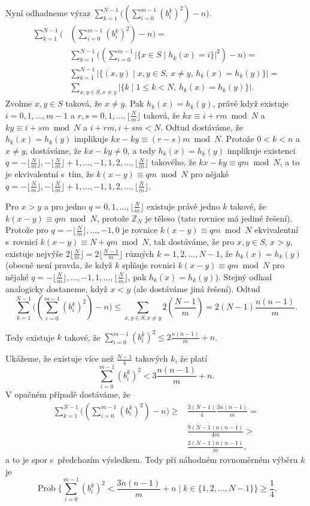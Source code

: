 \documentclass[a4paper,12pt]{article}
\DeclareMathOperator*{\Prob}{Prob}
\begin{document}
Nyní odhadneme výraz $\sum_{k=1}^{N-1}\big((\sum_{
i=0}^{m-1}(b_i^k)^2)-n\big)$.
\begin{align*}\sum_{k=1}^{N-1}\big(&(\sum_{i=0}^{m-1}(b_i^k)^2)-n\big)=\\
&\sum_{k=1}^{N-1}\big((\sum_{i=0}^{m-1}|\{x\in S\mid h_k(x)=i\}|^
2)-n\big)=\\
&\sum_{k=1}^{N-1}|\{(x,y)\mid x,y\in S,\,x\ne y,\,h_k(x)=h_k(y)\}
|=\\
&\sum_{x,y\in S,x\ne y}|\{k\mid 1\le k<N,\,h_k(x)=h_k(y)\}|.\end{align*}
Zvolme $x,y\in S$ taková, že $x\ne y$. Pak $h_k(x)=h_k(y)$, 
právě když existuje $i=0,1,\dots,m-1$ a $r,s=0,1,\dots,\lfloor\frac 
Nm\rfloor$ 
taková, že $kx\equiv i+rm\bmod N$ a $ky\equiv i+sm\bmod N$ a $
i+rm,i+sm<N$. Odtud dostáváme, že $h_k(x)=h_k(y)$ implikuje $
kx-ky\equiv (r-s)m\bmod N$.
Protože $0<k<n$ a $x\ne y$, dostáváme, že $kx-ky\ne 0$, a tedy 
$h_k(x)=h_k(y)$ implikuje existenci 
$q=-\lfloor\frac Nm\rfloor ,-\lfloor\frac Nm\rfloor +1,\dots,-1,1
,2,\dots,\lfloor\frac Nm\rfloor$ takového, že 
$kx-ky\equiv qm\bmod N$,
a to je 
ekvivalentní s~tím, že $k(x-y)\equiv qm\bmod N$ pro nějaké 
$q=-\lfloor\frac Nm\rfloor ,-\lfloor\frac Nm\rfloor +1,\dots,-1,1
,2,\dots,\lfloor\frac Nm\rfloor$.

Pro $x>y$ a pro jedno $q=0,1,\dots,\lfloor\frac Nm\rfloor$ e\-xis\-tuje 
právě jedno $k$ takové, že $k(x-y)\equiv qm\bmod N$, protože 
$\mathbb Z_N$ je těleso (tato rovnice má jediné řešení). 
Protože pro $q=-\lfloor\frac Nm\rfloor ,\dots,-1,0$ je rovnice $
k(x-y)\equiv qm\bmod N$ 
ekvivalentní s~rovnicí $k(x-y)\equiv N+qm\bmod N$, tak 
dostáváme, že pro $x,y\in S$, $x>y$, existuje nejvýše 
$2\lfloor\frac Nm\rfloor =2\lfloor\frac {N-1}m\rfloor$ různých $
k=1,2,\dots,N-1$, že $h_k(x)=h_k(y)$ (obecně není pravda, že když 
$k$ splňuje rovnici $k(x-y)\equiv qm\bmod N$ pro nějaké 
$q=-\lfloor\frac Nm\rfloor ,\dots,-1,1,\dots,\lfloor\frac Nm\rfloor$, 
pak $h_k(x)=h_k(y)$). Stejný odhad analogicky dostaneme, když $
x<y$ 
(ale dostáváme jiná řešení). Odtud 
$$\sum_{k=1}^{N-1}\big((\sum_{i=0}^{m-1}(b_i^k)^2)-n\big)\le\sum_{
x,y\in S,x\ne y}2(\frac {N-1}m)=2(N-1)\frac {n(n-1)}m.$$

Tedy existuje $k$ takové, že $\sum_{i=0}^{m-1}(b_i^
k)^2\le 2\frac {n(n-1)}m+n$. 

Ukážeme, že existuje více než $\frac {N-
1}4$ takových 
$k$, že platí
$$\sum_{i=0}^{m-1}(b_i^k)^2<3\frac {n(n-1)}m+n.$$
V opačném případě dostáváme, že 
\begin{align*}\sum_{k=1}^{N-1}\big((\sum_{i=0}^{m-1}(b_i^k)^2)-n\big)\ge&\frac {
3(N-1)}4\frac {3n(n-1)}m=\\
&\frac {9(N-1)n(n-1)}{4m}>\\
&\frac {2(N-1)n(n-1)}m,\end{align*}
a to je spor s~předchozím výsledkem. Tedy při náhodném rovnoměrném 
výběru $k$ je 
$$\Prob\{\sum_{i=0}^{m-1}(b_i^k)^2<\frac {3n(n-1)}m+n\mid k\in \{
1,2,\dots,N-1\}\}\ge\frac 14.$$
\end{document}

